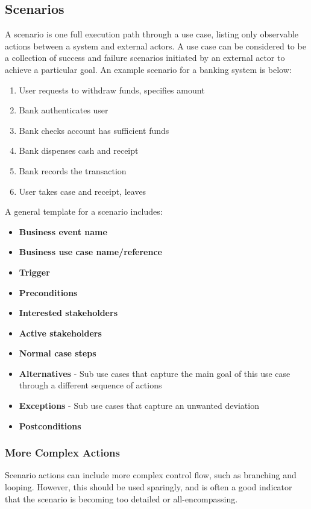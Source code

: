 \documentclass[12pt,titlepage]{article}
\begin{document}
    \subsection{Scenarios}
      A scenario is one full execution path through a use case, listing only observable actions between a system and external actors. A use case can
      be considered to be a collection of success and failure scenarios initiated by an external actor to achieve a particular goal. An example scenario
      for a banking system is below:
      \begin{enumerate}
        \item User requests to withdraw funds, specifies amount
        \item Bank authenticates user
        \item Bank checks account has sufficient funds
        \item Bank dispenses cash and receipt
        \item Bank records the transaction
        \item User takes case and receipt, leaves
      \end{enumerate}

      A general template for a scenario includes:
      \begin{itemize}
        \item \textbf{Business event name}
        \item \textbf{Business use case name/reference}
        \item \textbf{Trigger}
        \item \textbf{Preconditions}
        \item \textbf{Interested stakeholders}
        \item \textbf{Active stakeholders}
        \item \textbf{Normal case steps}
        \item \textbf{Alternatives} - Sub use cases that capture the main goal of this use case through a different sequence of actions
        \item \textbf{Exceptions} - Sub use cases that capture an unwanted deviation
        \item \textbf{Postconditions}
      \end{itemize}

      \subsubsection{More Complex Actions}
        Scenario actions can include more complex control flow, such as branching and looping. However, this should be used sparingly, and is
        often a good indicator that the scenario is becoming too detailed or all-encompassing.
\end{document}
